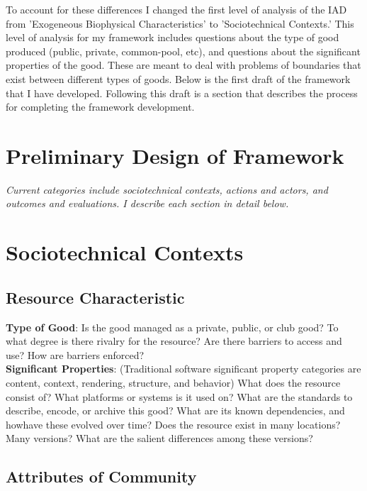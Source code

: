 \documentclass[thesis,tocnosub,noragright,centerchapter,12pt]{uiucecethesis09}
\begin{document}
{To account for these differences I changed the first level of analysis of the IAD from 'Exogeneous Biophysical Characteristics' to 'Sociotechnical Contexts.' This level of analysis for my framework includes questions about the type of good produced (public, private, common-pool, etc), and questions about the significant properties of the good. These are meant to deal with problems of boundaries that exist between different types of goods. Below is the first draft of the framework that I have developed. Following this draft is a section that describes the process for completing the framework development.

\section*{Preliminary Design of Framework}

\emph{Current categories include sociotechnical contexts, actions and actors, and outcomes and evaluations. I describe each section in detail below.} 

\section*{Sociotechnical Contexts}
\subsection*{Resource Characteristic}

\begin{list}{\quad}{}
\item[]
\textbf{Type of Good}: Is the good managed as a private, public, or club
good? To what degree is there rivalry for the resource? Are there
barriers to access and use? How are barriers enforced?\\

\textbf{Significant Properties}: 
(Traditional software significant property categories are content, context, rendering, structure, and behavior) What does the resource consist of? What
platforms or systems is it used on? What are the standards to describe, encode, or archive this good? What are its known dependencies, and howhave these evolved over time? Does the resource exist in many locations?
Many versions? What are the salient differences among these versions?\\
\end{list}


\subsection*{Attributes of Community}

}
\end{document}
